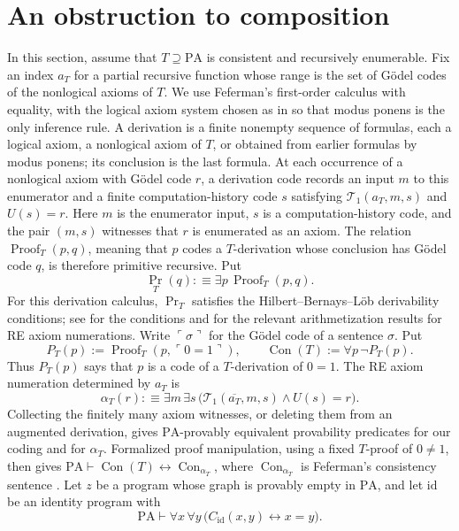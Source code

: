 \documentclass[11pt]{article}
\newcommand{\PA}{\mathrm{PA}}
\newcommand{\Con}{\operatorname{Con}}
\newcommand{\Proof}{\operatorname{Proof}}
\begin{document}
\section{An obstruction to composition}\label{sec:obstruction}

In this section, assume that $T\supseteq\PA$ is consistent and recursively
enumerable. Fix an index
$a_T$ for a partial recursive function whose range is the set of G\"odel
codes of the nonlogical axioms of $T$.
We use Feferman's first-order calculus with equality, with the
logical axiom system chosen as in \cite[p.~266]{Feferman} so that
modus ponens is the only inference rule.
A derivation is a finite nonempty sequence of formulas, each a
logical axiom, a nonlogical axiom of $T$, or obtained from earlier
formulas by modus ponens; its conclusion is the last formula.
At each occurrence of a nonlogical
axiom with G\"odel code $r$, a derivation code records an input $m$ to this
enumerator and a finite computation-history code $s$ satisfying
$\mathcal{T}_1(a_T,m,s)$ and $U(s)=r$. Here $m$ is the enumerator input, $s$ is a
computation-history code, and the pair $(m,s)$ witnesses that $r$ is
enumerated as an axiom. The relation $\Proof_T(p,q)$, meaning
that $p$ codes a $T$-derivation whose conclusion has G\"odel code $q$, is
therefore primitive recursive. Put
\[
 \operatorname{Pr}_T(q):\!\equiv\exists p\,\Proof_T(p,q).
\]
For this derivation calculus, $\operatorname{Pr}_T$ satisfies the
Hilbert--Bernays--L\"ob derivability conditions; see
\cite[pp.~115--116]{Lob} for the conditions and
\cite[pp.~269--271, especially Theorems~2.4(i) and~2.8]{Feferman}
for the relevant arithmetization results for RE axiom numerations.
Write
$\ulcorner\sigma\urcorner$ for the G\"odel code of a sentence $\sigma$. Put
\[
 P_T(p):=\Proof_T(p,\ulcorner0=1\urcorner),
 \qquad
 \Con(T):=\forall p\,\neg P_T(p).
\]
Thus $P_T(p)$ says that $p$ is a code of a $T$-derivation of $0=1$.
The RE axiom numeration determined by $a_T$ is
\[
 \alpha_T(r):\!\equiv
 \exists m\,\exists s\,
 \bigl(\mathcal{T}_1(\overline{a_T},m,s)\land U(s)=r\bigr).
\]
Collecting the finitely many axiom witnesses, or deleting them
from an augmented derivation, gives $\PA$-provably equivalent
provability predicates for our coding and for $\alpha_T$.
Formalized proof manipulation, using a fixed $T$-proof of
$0\ne1$, then gives
$\PA\vdash\Con(T)\leftrightarrow\Con_{\alpha_T}$,
where $\Con_{\alpha_T}$ is Feferman's consistency sentence
\cite[p.~269]{Feferman}.
Let $z$ be a program whose graph is provably empty in $\PA$, and
let $\mathrm{id}$ be an identity program with
\[
 \PA\vdash\forall x\,\forall y\,
 \bigl(C_{\mathrm{id}}(x,y)\longleftrightarrow x=y\bigr).
\]
\end{document}
